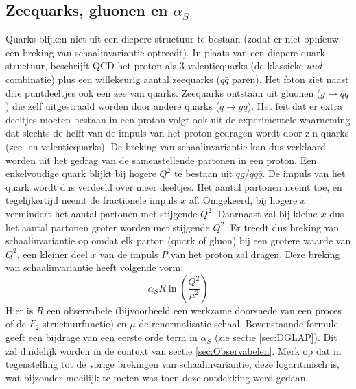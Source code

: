 \documentclass[a4paper,11pt]{article}
\numberwithin{equation}{section} %
\begin{document}
  \subsection{Zeequarks, gluonen en $\alpha_S$}
Quarks blijken niet uit een diepere structuur te bestaan (zodat er niet opnieuw een breking van schaalinvariantie optreedt).
In plaats van een diepere quark structuur, beschrijft QCD het proton als 3 valentiequarks (de klassieke $u u d$ combinatie) plus een willekeurig aantal zeequarks ($q\bar{q}$ paren).
Het foton ziet naast drie puntdeeltjes ook een zee van quarks.
Zeequarks ontstaan uit gluonen ($g\rightarrow q\bar{q}$) die zelf uitgestraald worden door andere quarks ($q\rightarrow gq$).
Het feit dat er extra deeltjes moeten bestaan in een proton volgt ook uit de experimentele waarneming dat slechts de helft van de impuls van het proton gedragen wordt door z’n quarks (zee- en valentiequarks).
De breking van schaalinvariantie kan dus verklaard worden uit het gedrag van de samenstellende partonen in een proton.
Een enkelvoudige quark blijkt bij hogere $Q^2$ te bestaan uit $q g/q q\bar{q}$.
De impuls van het quark wordt dus verdeeld over meer deeltjes.
Het aantal partonen neemt toe, en tegelijkertijd neemt de fractionele impuls $x$ af.
Omgekeerd, bij hogere $x$ vermindert het aantal partonen met stijgende $Q^2$.
Daarnaast zal bij kleine $x$ dus het aantal partonen groter worden met stijgende $Q^2$.
Er treedt dus breking van schaalinvariantie op omdat elk parton (quark of gluon) bij een grotere waarde van $Q^2$, een kleiner deel  $x$ van de impuls $P$ van het proton zal dragen.
Deze breking van schaalinvariantie heeft volgende vorm:
\begin{equation}
\alpha_S R \ln{\left( \frac{Q^2}{\mu^2}\right)}
\end{equation}
Hier is $R$ een observabele (bijvoorbeeld een werkzame doorsnede van een proces of de $F_2$ structuurfunctie) en $\mu$ de renormalisatie schaal.
Bovenstaande formule geeft een bijdrage van een eerste orde term in $\alpha_S$ (zie sectie \ref{sec:DGLAP}).
Dit zal duidelijk worden in de context van sectie \ref{sec:Observabelen}.
Merk op dat in tegenstelling tot de vorige brekingen van schaalinvariantie, deze logaritmisch is, wat bijzonder moeilijk te meten was toen deze ontdekking werd gedaan.
\end{document}
